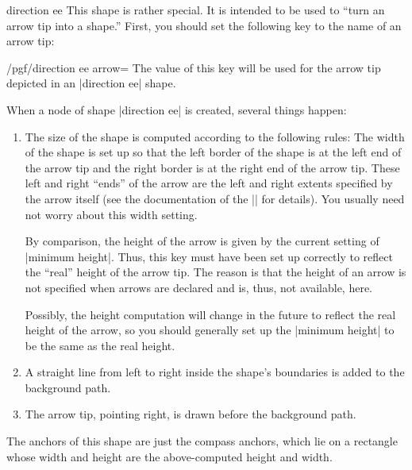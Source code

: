 \begin{shape}{direction ee}
  This shape is rather special. It is intended to be used to ``turn an
  arrow tip into a shape.'' First, you should set the following key to
  the name of an arrow tip:
  \begin{key}{/pgf/direction ee arrow=}
    The value of this key will be used for the arrow tip depicted in
    an |direction ee| shape.
  \end{key}
  When a node of shape |direction ee| is created, several things
  happen:
  \begin{enumerate}
  \item The size of the shape is computed according to the following
    rules: The width of the shape is set up so that the left border of
    the shape is at the left end of the arrow tip and the right border
    is at the right end of the arrow tip. These left and right
    ``ends'' of the arrow are the left and right extents specified by
    the arrow itself (see the documentation of the |\pgfarrowsdeclare|
    for details). You usually need not worry about this width
    setting.

    By comparison, the height of the arrow is given by the current
    setting of |minimum height|. Thus, this key must have been set up
    correctly to reflect the ``real'' height of the arrow tip. The
    reason is that the height of an arrow is not specified when arrows
    are declared and is, thus, not available, here.

    Possibly, the height computation will change in the future to
    reflect the real height of the arrow, so you should generally
    set up the |minimum height| to be the same as the real height.
  \item A straight line from left to right inside the shape's
    boundaries is added to the background path.
  \item The arrow tip, pointing right, is drawn before the background
    path.
  \end{enumerate}
  The anchors of this shape are just the compass anchors, which lie on
  a rectangle whose width and height are the above-computed height and
  width.

\begin{codeexample}[]
\end{codeexample}


\end{shape}
